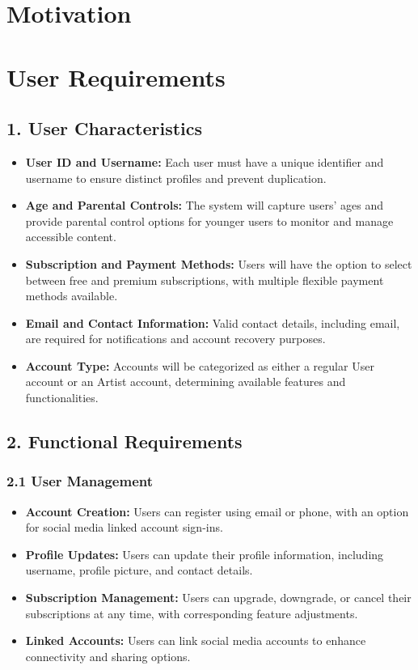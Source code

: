 \documentclass[a4paper,10pt]{article}
\begin{document}
\section{Motivation}

\section{User Requirements}
\subsection{1. User Characteristics}
    \begin{itemize}[leftmargin=*]
        \item \textbf{User ID and Username:} Each user must have a unique identifier and username to ensure distinct profiles and prevent duplication.
        \item \textbf{Age and Parental Controls:} The system will capture users’ ages and provide parental control options for younger users to monitor and manage accessible content.
        \item \textbf{Subscription and Payment Methods:} Users will have the option to select between free and premium subscriptions, with multiple flexible payment methods available.
        \item \textbf{Email and Contact Information:} Valid contact details, including email, are required for notifications and account recovery purposes.
        \item \textbf{Account Type:} Accounts will be categorized as either a regular User account or an Artist account, determining available features and functionalities.
    \end{itemize}

\subsection{2. Functional Requirements}
\subsubsection{2.1 User Management}
    \begin{itemize}[leftmargin=*]
        \item \textbf{Account Creation:} Users can register using email or phone, with an option for social media linked account sign-ins.
        \item \textbf{Profile Updates:} Users can update their profile information, including username, profile picture, and contact details.
        \item \textbf{Subscription Management:} Users can upgrade, downgrade, or cancel their subscriptions at any time, with corresponding feature adjustments.
        \item \textbf{Linked Accounts:} Users can link social media accounts to enhance connectivity and sharing options.
    \end{itemize}
\end{document}
